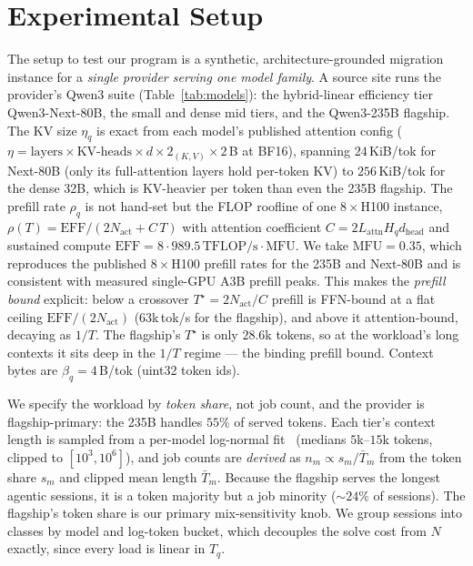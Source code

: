 \section{Experimental Setup}
\label{sec:setup}

The setup to test our program is a synthetic, architecture-grounded migration
instance for a \emph{single provider serving one model family}. A source site runs
the provider's Qwen3 suite (Table~\ref{tab:models}): the hybrid-linear efficiency
tier Qwen3-Next-80B, the small and dense mid tiers, and the Qwen3-235B flagship.
The KV size $\eta_q$ is exact from each model's published attention config
($\eta = \text{layers}\times\text{KV-heads}\times d \times 2_{(K,V)}\times 2$\,B at
BF16), spanning $24$\,KiB/tok for Next-80B (only its full-attention layers hold
per-token KV) to $256$\,KiB/tok for the dense 32B, which is KV-heavier per token
than even the 235B flagship. The prefill rate $\rho_q$ is not hand-set but the FLOP
roofline of one $8{\times}$H100 instance, $\rho(T)=\mathrm{EFF}/(2N_{\text{act}}+C\,T)$
with attention coefficient $C=2L_{\text{attn}}H_q d_{\text{head}}$ and sustained
compute $\mathrm{EFF}=8\cdot989.5\,\text{TFLOP/s}\cdot\text{MFU}$. We take
$\text{MFU}{=}0.35$, which reproduces the published $8{\times}$H100 prefill rates for
the 235B and Next-80B and is consistent with measured single-GPU A3B prefill peaks.
This makes the \emph{prefill bound} explicit: below a crossover
$T^\star{=}2N_{\text{act}}/C$ prefill is FFN-bound at a flat ceiling
$\mathrm{EFF}/(2N_{\text{act}})$ ($63$k\,tok/s for the flagship), and above it
attention-bound, decaying as $1/T$. The flagship's $T^\star$ is only $28.6$k tokens,
so at the workload's long contexts it sits deep in the $1/T$ regime --- the binding
prefill bound. Context bytes are $\beta_q=4$\,B/tok (uint32 token ids).

We specify the workload by \emph{token share}, not job count, and the provider is
flagship-primary: the 235B handles $55\%$ of served tokens. Each tier's context
length is sampled from a per-model log-normal fit~\cite{servegen} (medians
$5$k--$15$k tokens, clipped to $[10^3,10^6]$), and job counts are \emph{derived} as
$n_m \propto s_m/\bar T_m$ from the token share $s_m$ and clipped mean length
$\bar T_m$. Because the flagship serves the longest agentic sessions, it is a token
majority but a job minority (${\sim}24\%$ of sessions). The flagship's token share
is our primary mix-sensitivity knob. We group sessions into classes by model and
log-token bucket, which decouples the solve cost from $N$ exactly, since every load
is linear in $T_q$.

